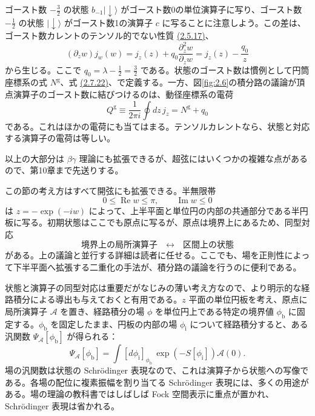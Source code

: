 ゴースト数 $-\frac32$ の状態 $b_{-1}\lvert\downarrow\rangle$ がゴースト数0の単位演算子に写り、ゴースト数 $-\frac12$ の状態 $\lvert\downarrow\rangle$ がゴースト数1の演算子 $c$ に写ることに注意しよう。この差は、ゴースト数カレントのテンソル的でない性質 \hyperref[eq:2.5.17]{(2.5.17)}、
\begin{equation}
(\partial_z w)j_w(w)=j_z(z)
+q_0\frac{\partial_z^2w}{\partial_z w}
=j_z(z)-\frac{q_0}{z}
\tag{2.8.13}\label{eq:2.8.13}
\end{equation}
から生じる。ここで $q_0=\lambda-\frac12=\frac32$ である。状態のゴースト数は慣例として円筒座標系の式 $N^{\mathrm g}$、式 \hyperref[eq:2.7.22]{(2.7.22)}、で定義する。一方、図\ref{fig:2.6}の積分路の議論が頂点演算子のゴースト数に結びつけるのは、動径座標系の電荷
\begin{equation}
Q^{\mathrm g}\equiv\frac1{2\pi i}\oint dz\,j_z
=N^{\mathrm g}+q_0
\tag{2.8.14}\label{eq:2.8.14}
\end{equation}
である。これはほかの電荷にも当てはまる。テンソルカレントなら、状態と対応する演算子の電荷は等しい。

以上の大部分は $\beta\gamma$ 理論にも拡張できるが、超弦にはいくつかの複雑な点があるので、第10章まで先送りする。

この節の考え方はすべて開弦にも拡張できる。半無限帯
\begin{equation}
0\leq\operatorname{Re}w\leq\pi,\qquad \operatorname{Im}w\leq0
\tag{2.8.15}\label{eq:2.8.15}
\end{equation}
は $z=-\exp(-iw)$ によって、上半平面と単位円の内部の共通部分である半円板に写る。初期状態はここでも原点に写るが、原点は境界上にあるため、同型対応
\begin{equation}
\text{境界上の局所演算子}
\quad\longleftrightarrow\quad
\text{区間上の状態}
\tag{2.8.16}\label{eq:2.8.16}
\end{equation}
がある。上の議論と並行する詳細は読者に任せる。ここでも、場を正則性によって下半平面へ拡張する二重化の手法が、積分路の議論を行うのに便利である。


状態と演算子の同型対応は重要だがなじみの薄い考え方なので、より明示的な経路積分による導出も与えておくと有用である。$z$ 平面の単位円板を考え、原点に局所演算子 $\mathcal A$ を置き、経路積分の場 $\phi$ を単位円上である特定の境界値 $\phi_{\mathrm b}$ に固定する。$\phi_{\mathrm b}$ を固定したまま、円板の内部の場 $\phi_{\mathrm i}$ について経路積分すると、ある汎関数 $\Psi_{\mathcal A}[\phi_{\mathrm b}]$ が得られる：
\begin{equation}
\Psi_{\mathcal A}[\phi_{\mathrm b}]
=\int[d\phi_{\mathrm i}]_{\phi_{\mathrm b}}\,
\exp(-S[\phi_{\mathrm i}])\mathcal A(0).
\tag{2.8.17}\label{eq:2.8.17}
\end{equation}
場の汎関数は状態の Schrödinger 表現なので、これは演算子から状態への写像である。各場の配位に複素振幅を割り当てる Schrödinger 表現には、多くの用途がある。場の理論の教科書ではしばしば Fock 空間表示に重点が置かれ、Schrödinger 表現は省かれる。

